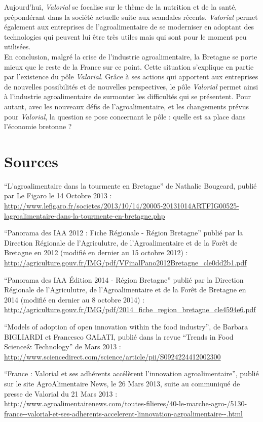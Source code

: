 \documentclass[a4paper,12pt]{report}
\begin{document}
	Aujourd’hui, \textit{Valorial} se focalise sur le thème de la nutrition et de la santé, prépondérant dans la société actuelle suite aux scandales récents. \textit{Valorial} permet également aux entreprises de l’agroalimentaire de se moderniser en adoptant des technologies qui peuvent lui être très utiles mais qui sont pour le moment peu utilisées.\\

	En conclusion, malgré la crise de l’industrie agroalimentaire, la Bretagne se porte mieux que le reste de la France sur ce point. Cette situation s’explique en partie par l’existence du pôle \textit{Valorial}. Grâce à ses actions qui apportent aux entreprises de nouvelles possibilités et de nouvelles perspectives, le pôle \textit{Valorial} permet ainsi à l’industrie agroalimentaire de surmonter les difficultés qui se présentent. Pour autant, avec les nouveaux défis de l’agroalimentaire, et les changements prévus pour \textit{Valorial}, la question se pose concernant le pôle : quelle est sa place dans l’économie bretonne ?

    
\section*{Sources}
“L’agroalimentaire dans la tourmente en Bretagne” de Nathalie Bougeard, publié par Le Figaro le 14 Octobre 2013 : \url{http://www.lefigaro.fr/societes/2013/10/14/20005-20131014ARTFIG00525-lagroalimentaire-dans-la-tourmente-en-bretagne.php}

“Panorama des IAA 2012 : Fiche Régionale - Région Bretagne” publié par la Direction Régionale de l’Agriculutre, de l’Agroalimentaire et de la Forêt de Bretagne en 2012 (modifié en dernier au 15 octobre 2012) : \url{http://agriculture.gouv.fr/IMG/pdf/VFinalPano2012Bretagne_cle0dd2b1.pdf}

“Panorama des IAA Édition 2014 - Région Bretagne” publié par la Direction Régionale de l’Agriculutre, de l’Agroalimentaire et de la Forêt de Bretagne en 2014 (modifié en dernier au 8 octobre 2014) : \url{http://agriculture.gouv.fr/IMG/pdf/2014_fiche_region_bretagne_cle4594e6.pdf}

“Models of adoption of open innovation within the food industry”, de Barbara BIGLIARDI et Francesco GALATI, publié dans la revue “Trends in Food Science\& Technology” de Mars 2013 :\\ \url{http://www.sciencedirect.com/science/article/pii/S0924224412002300}

“France : Valorial et ses adhérents accélèrent l’innovation agroalimentaire”, publié sur le site AgroAlimentaire News, le 26 Mars 2013, suite au communiqué de presse de Valorial du 21 Mars 2013 : \url{http://www.agroalimentairenews.com/toutes-filieres/40-le-marche-agro-/5130-france--valorial-et-ses-adherents-accelerent-linnovation-agroalimentaire--.html}
\end{document}
